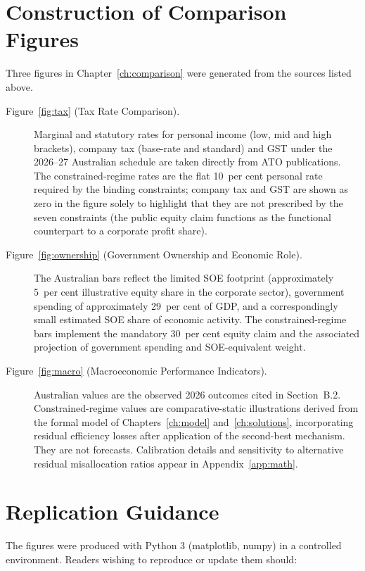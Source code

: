 \documentclass[12pt,anyside]{book}
\theoremstyle{definition}
\theoremstyle{plain}
\theoremstyle{remark}
\begin{document}
\section{Construction of Comparison Figures}

Three figures in Chapter~\ref{ch:comparison} were generated from the sources listed above.

\begin{description}
\item[Figure~\ref{fig:tax} (Tax Rate Comparison).]  
  Marginal and statutory rates for personal income (low, mid and high brackets), company tax (base-rate and standard) and GST under the 2026--27 Australian schedule are taken directly from ATO publications. The constrained-regime rates are the flat 10~per cent personal rate required by the binding constraints; company tax and GST are shown as zero in the figure solely to highlight that they are not prescribed by the seven constraints (the public equity claim functions as the functional counterpart to a corporate profit share).

\item[Figure~\ref{fig:ownership} (Government Ownership and Economic Role).]  
  The Australian bars reflect the limited SOE footprint (approximately 5~per cent illustrative equity share in the corporate sector), government spending of approximately 29~per cent of GDP, and a correspondingly small estimated SOE share of economic activity. The constrained-regime bars implement the mandatory 30~per cent equity claim and the associated projection of government spending and SOE-equivalent weight.

\item[Figure~\ref{fig:macro} (Macroeconomic Performance Indicators).]  
  Australian values are the observed 2026 outcomes cited in Section~B.2. Constrained-regime values are comparative-static illustrations derived from the formal model of Chapters~\ref{ch:model} and~\ref{ch:solutions}, incorporating residual efficiency losses after application of the second-best mechanism. They are not forecasts. Calibration details and sensitivity to alternative residual misallocation ratios appear in Appendix~\ref{app:math}.
\end{description}

\section{Replication Guidance}

The figures were produced with Python 3 (matplotlib, numpy) in a controlled environment. Readers wishing to reproduce or update them should:
\end{document}
